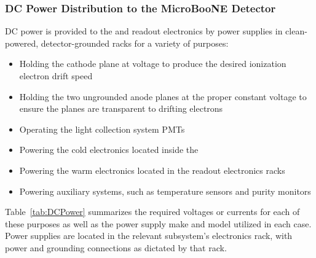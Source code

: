 \subsubsection{DC Power Distribution to the MicroBooNE Detector}
DC power is provided to the \lartpc and readout electronics by power supplies in clean-powered, detector-grounded racks for a variety of purposes:
\begin{itemize}
\item{Holding the \lartpc cathode plane at voltage to produce the desired ionization electron drift speed}
\item{Holding the two ungrounded anode planes at the proper constant voltage to ensure the planes are transparent to drifting electrons}
\item{Operating the light collection system PMTs}
\item{Powering the cold electronics located inside the \lartpc}
\item{Powering the warm electronics located in the \lartpc readout electronics racks}
\item{Powering auxiliary systems, such as \lartpc temperature sensors and purity monitors}
\end{itemize}

Table~\ref{tab:DCPower} summarizes the required voltages or currents for each of these purposes as well as the power supply make and model utilized in each case.  Power supplies are located in the relevant subsystem's electronics rack, with power and grounding connections as dictated by that rack.

